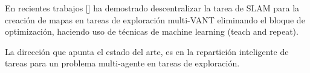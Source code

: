 En recientes trabajos \cite{CIESLEWSKI2021}[] ha demostrado descentralizar la tarea de SLAM para la creaci\'{o}n de mapas en tareas de exploraci\'{o}n multi-VANT eliminando el bloque de optimizaci\'{o}n, haciendo uso de t\'{e}cnicas de machine learning (teach and repeat).

La dirección que apunta el estado del arte, es en la repartición inteligente de tareas para un problema multi-agente en tareas de exploración.




  
 

